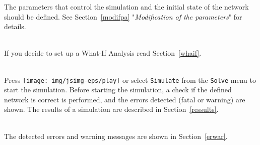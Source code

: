 The parameters that control the simulation and the initial state
of the network should be defined. See Section~\ref{modifpa}
"\emph{Modification of the parameters}" for details.

\\
If you decide to set up a What-If Analysis read
Section~\ref{whaif}.

\\
Press
\texttt{[image: img/jsimg-eps/play]} or select
\texttt{Simulate} from the \texttt{Solve} menu to start the
simulation.  Before starting the simulation, a check if the
defined network is correct is performed, and the errors detected
(fatal or warning) are shown.  The results of a simulation are
described in Section~\ref{ressults}.

\\
The detected errors and warning messages are shown in
Section~\ref{erwar}.\\



